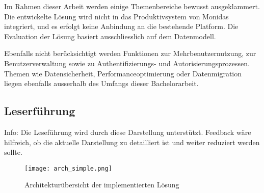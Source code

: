 Im Rahmen dieser Arbeit werden einige Themenbereiche bewusst ausgeklammert. Die entwickelte Lösung wird nicht in das Produktivsystem von Monidas integriert, und es erfolgt keine Anbindung an die bestehende Platform. Die Evaluation der Lösung basiert ausschliesslich auf dem Datenmodell.

Ebenfalls nicht berücksichtigt werden Funktionen zur Mehrbenutzernutzung, zur Benutzerverwaltung sowie zu Authentifizierungs- und Autorisierungsprozessen. Themen wie Datensicherheit, Performanceoptimierung oder Datenmigration liegen ebenfalls ausserhalb des Umfangs dieser Bachelorarbeit.

\subsection{Leserführung}



Info: Die Leseführung wird durch diese Darstellung unterstützt. Feedback wäre hilfreich, ob die aktuelle Darstellung zu detailliert ist und weiter reduziert werden sollte. 

\begin{figure}[H]
  \centering
  \texttt{[image: arch\_simple.png]}
  \caption{Architekturübersicht der implementierten Lösung}
  \label{fig:arch_simple}
\end{figure}




